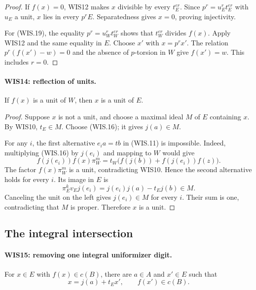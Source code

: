 \documentclass[11pt,a4paper]{article}
\numberwithin{equation}{section}
\theoremstyle{remark}\newtheorem{remark}[theorem]{Remark}
\begin{document}
\begin{proof}
If $f(x)=0$, WIS12 makes $x$ divisible by every
$t_E^{er}$. Since $p^r=u_E^rt_E^{er}$ with $u_E$
a unit, $x$ lies in every $p^rE$. Separatedness gives
$x=0$, proving injectivity.

For (WIS.19), the equality $p^r=u_W^rt_W^{er}$
shows that $t_W^{er}$ divides $f(x)$. Apply WIS12
and the same equality in $E$. Choose $x'$ with
$x=p^rx'$. The relation $p^r(f(x')-w)=0$ and
the absence of $p$-torsion in $W$ give $f(x')=w$.
This includes $r=0$.
\end{proof}

\paragraph{WIS14: reflection of units.}
\label{claim:WIS14}
If $f(x)$ is a unit of $W$, then $x$ is a unit of $E$.

\begin{proof}
Suppose $x$ is not a unit, and choose a maximal ideal
$M$ of $E$ containing $x$. By WIS10, $t_E\in M$.
Choose (WIS.16); it gives $j(a)\in M$.

For any $i$, the first alternative $e_i a=tb$ in
(WIS.11) is impossible. Indeed, multiplying (WIS.16)
by $j(e_i)$ and mapping to $W$ would give
\[
 f(j(e_i)) f(x)\pi_W^m
       =t_W\bigl(f(j(b))+f(j(e_i))f(z)\bigr).
 \tag{WIS.20}
\]
The factor $f(x)\pi_W^m$ is a unit, contradicting WIS10.
Hence the second alternative holds for every $i$.
Its image in $E$ is
\[
         \pi_E^kv_Ej(e_i)=j(e_i)j(a)-t_Ej(b)\in M.
\]
Canceling the unit on the left gives $j(e_i)\in M$
for every $i$. Their sum is one, contradicting that
$M$ is proper. Therefore $x$ is a unit.
\end{proof}

\subsection{The integral intersection}

\paragraph{WIS15: removing one integral uniformizer digit.}
\label{claim:WIS15}
For $x\in E$ with $f(x)\in c(B)$, there are $a\in A$
and $x'\in E$ such that
\[
                   x=j(a)+t_Ex',\qquad f(x')\in c(B).      \tag{WIS.21}
\]
\end{document}
